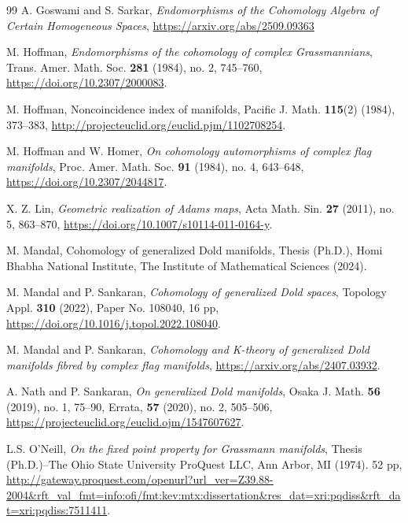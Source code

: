 \documentclass{amsart}
\begin{document}
\begin{thebibliography}{99}
 A. Goswami and S. Sarkar, \textit{Endomorphisms of the Cohomology Algebra of Certain Homogeneous Spaces}, \url{https://arxiv.org/abs/2509.09363}

 M. Hoffman, \textit{Endomorphisms of the cohomology of complex Grassmannians}, Trans. Amer. Math. Soc. \textbf{281} (1984), no. 2, 745--760, \url{https://doi.org/10.2307/2000083}.

 M. Hoffman, Noncoincidence index of manifolds, Pacific J. Math. \textbf{115}(2) (1984), 373--383, \url{http://projecteuclid.org/euclid.pjm/1102708254}.

 M. Hoffman and W. Homer, \textit{On cohomology automorphisms of complex flag manifolds}, Proc. Amer. Math. Soc. \textbf{91} (1984), no. 4, 643--648, \url{https://doi.org/10.2307/2044817}.

    
 X. Z. Lin, \textit{Geometric realization of Adams maps}, Acta Math. Sin. \textbf{27} (2011), no. 5, 863--870, \url{https://doi.org/10.1007/s10114-011-0164-y}.

 M. Mandal, Cohomology of generalized Dold manifolds, Thesis (Ph.D.), Homi Bhabha National Institute, The Institute of Mathematical Sciences (2024).
	
 M. Mandal and P. Sankaran, \textit{Cohomology of generalized Dold spaces}, Topology Appl. \textbf{310} (2022), Paper No. 108040, 16 pp, \url{https://doi.org/10.1016/j.topol.2022.108040}.
    
 M. Mandal and P. Sankaran, \textit{Cohomology and K-theory of generalized Dold manifolds fibred by complex flag manifolds}, \url{https://arxiv.org/abs/2407.03932}.
	
 A. Nath and P. Sankaran, \textit{On generalized Dold manifolds}, Osaka J. Math. \textbf{56} (2019), no. 1, 75--90, Errata, \textbf{57} (2020), no. 2, 505--506, \url{https://projecteuclid.org/euclid.ojm/1547607627}.
	
 L.S. %
O'Neill, \textit{On the fixed point property for Grassmann manifolds}, Thesis %
(Ph.D.)--The Ohio State University ProQuest LLC, Ann Arbor, MI (1974). 52 pp, \url{http://gateway.proquest.com/openurl?url_ver=Z39.88-2004&rft_val_fmt=info:ofi/fmt:kev:mtx:dissertation&res_dat=xri:pqdiss&rft_dat=xri:pqdiss:7511411}.
  

\end{thebibliography}
\end{document}
